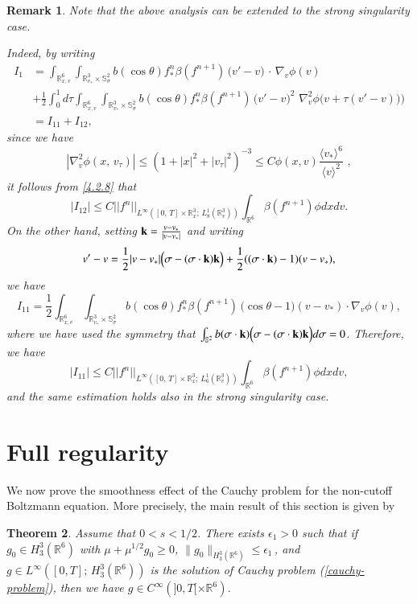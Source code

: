 \documentclass{amsart}[12pt, article]
\newtheorem{theo}{Theorem}[section]
\newtheorem{rema}[theo]{Remark}
\begin{document}
\begin{rema}
Note that the above analysis can be extended to the strong singularity
case.

Indeed, by writing
\begin{align*}
 I_1& =   \int_{{{{\mathbb R}}}^6_{x,
v}}\int_{{{{\mathbb R}}}^3_{v_*}\times{\mathbb{S}}^2_\sigma} b(\cos\theta)  f^{n}_\ast
\beta (f^{n+1 })\,\big(v'-v\big)\, \cdot\,  \nabla_v \phi  (v) \\
&+ \frac{1}{2} \int_0^1 d \tau  \int_{{{{\mathbb R}}}^6_{x,
v}}\int_{{{{\mathbb R}}}^3_{v_*}\times{\mathbb{S}}^2_\sigma} b(\cos\theta)  f^{n}_\ast
\beta (f^{n+1 })\,\big(v'-v\big)^2 \, \,  \nabla_v^2 \phi  \Big(v+
\tau (v'-v))\Big) \\
&= I_{11} + I_{12},
\end{align*}
since we have
$$
|\nabla_v^2 \phi (x,\, v_\tau)| \leq (1+|x|^2+|v_\tau|^2)^{-3}\leq C
\phi(x,v) \frac{\langle v_* \rangle^6}{\langle v \rangle^2}\,\, ,
$$
it follows {}from \eqref{4.2.8} that
$$|I_{12}| \leq C ||f^n||_{L^\infty([0,\, T]\times{{{\mathbb R}}}_x^3;\, L^1_{8}({{{\mathbb R}}}^3_v))}
\int_{{{{\mathbb R}}}^6}  \beta (f^{n+1}) \phi dxdv.
$$
On the other hand, setting $ {\bf k} = \frac{v-v_*}{|v-v_*|}$ and
writing
$$v' -v = \frac{1}{2}|v-v_*|\Big( \sigma - (\sigma \cdot {\bf k})  {\bf k} \Big)
+ \frac{1}{2} ((\sigma \cdot {\bf k})-1)( v-v_*),$$ we have
$$
 I_{11} =   \frac{1}{2}\int_{{{{\mathbb R}}}^6_{x,
v}}\int_{{{{\mathbb R}}}^3_{v_*}\times{\mathbb{S}}^2_\sigma} b(\cos\theta)  f^{n}_\ast
\beta (f^{n+1 })\,\big(\cos \theta -1 \big)(v-v_*) \cdot  \nabla_v
\phi  (v),
$$
where we have used the symmetry that $\int_{{\mathbb{S}}^2} b(\sigma
\cdot {\bf k})\Big( \sigma - (\sigma \cdot {\bf k})  {\bf k} \Big) d
\sigma =0$. Therefore, we have
$$|I_{11}| \leq C ||f^n||_{L^\infty([0,\, T]\times{{{\mathbb R}}}_x^3;\, L^1_{6}({{{\mathbb R}}}^3_v))}
\int_{{{{\mathbb R}}}^6}  \beta (f^{n+1}) \phi dxdv,
$$
and the same estimation holds also in the
strong singularity case.
\end{rema}

\section{Full regularity }\label{section6}
\smallbreak

We now prove the smoothness effect of the Cauchy problem  for the
non-cutoff Boltzmann equation. More precisely, the main result of this section is given by

\begin{theo}\label{theo4.5.1}
Assume that $0<s<1/2$. There exists $\epsilon_1>0$ such that if
 $g_0\in H^3_3({{{\mathbb R}}}^6)$ with $\mu + \mu^{1/2} g_0\geq 0$,
$ \|g_0\|_{H^3_3({{{\mathbb R}}}^6)}\leq \epsilon_1\,$,  and $ g \in L^\infty([0,
T];\, H^3_3({{{\mathbb R}}}^6))$ is the solution of Cauchy problem
(\ref{cauchy-problem}), then we have $g\in C^\infty(]0,
T[\times{{{\mathbb R}}}^6)$.
\end{theo}
\end{document}
